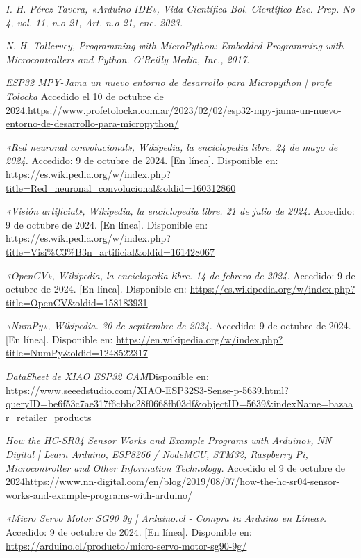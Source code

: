 \begin{thebibliography}{99}
    \textit{I. H. Pérez-Tavera, «Arduino IDE», Vida Científica Bol. Científico Esc. Prep. No 4, vol. 11, n.o 21, Art. n.o 21, ene. 2023.}
    
    \textit{N. H. Tollervey, Programming with MicroPython: Embedded Programming with Microcontrollers and Python. O’Reilly Media, Inc., 2017.}

    \textit{ESP32 MPY-Jama un nuevo entorno de desarrollo para Micropython | profe Tolocka} Accedido el 10 de octubre de 2024.\url{https://www.profetolocka.com.ar/2023/02/02/esp32-mpy-jama-un-nuevo-entorno-de-desarrollo-para-micropython/}
    
    \textit{«Red neuronal convolucional», Wikipedia, la enciclopedia libre. 24 de mayo de 2024.} Accedido: 9 de octubre de 2024. [En línea]. Disponible en: \url{https://es.wikipedia.org/w/index.php?title=Red_neuronal_convolucional&oldid=160312860}
    
    \textit{«Visión artificial», Wikipedia, la enciclopedia libre. 21 de julio de 2024.} Accedido: 9 de octubre de 2024. [En línea]. Disponible en: \url{https://es.wikipedia.org/w/index.php?title=Visi%C3%B3n_artificial&oldid=161428067}
    
    \textit{«OpenCV», Wikipedia, la enciclopedia libre. 14 de febrero de 2024.} Accedido: 9 de octubre de 2024. [En línea]. Disponible en: \url{https://es.wikipedia.org/w/index.php?title=OpenCV&oldid=158183931}
    
    \textit{«NumPy», Wikipedia. 30 de septiembre de 2024.} Accedido: 9 de octubre de 2024. [En línea]. Disponible en: \url{https://en.wikipedia.org/w/index.php?title=NumPy&oldid=1248522317}

    \textit{DataSheet de XIAO ESP32 CAM}Disponible en: \url{https://www.seeedstudio.com/XIAO-ESP32S3-Sense-p-5639.html?queryID=be6f53c7ae317f6cbbc28f0668fb03df&objectID=5639&indexName=bazaar_retailer_products}
            
    \textit{How the HC-SR04 Sensor Works and Example Programs with Arduino», NN Digital | Learn Arduino, ESP8266 / NodeMCU, STM32, Raspberry Pi, Microcontroller and Other Information Technology.} Accedido el 9 de octubre de 2024\url{https://www.nn-digital.com/en/blog/2019/08/07/how-the-hc-sr04-sensor-works-and-example-programs-with-arduino/}

    \textit{«Micro Servo Motor SG90 9g | Arduino.cl - Compra tu Arduino en Línea».} Accedido: 9 de octubre de 2024. [En línea]. Disponible en: \url{https://arduino.cl/producto/micro-servo-motor-sg90-9g/}


\end{thebibliography}
